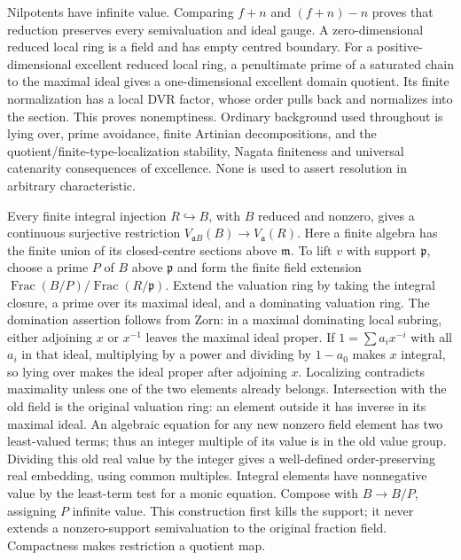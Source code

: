 \documentclass[11pt]{article}
\begin{document}
Nilpotents have infinite value. Comparing \(f+n\) and \((f+n)-n\) proves that reduction preserves every semivaluation and ideal gauge. A zero-dimensional reduced local ring is a field and has empty centred boundary. For a positive-dimensional excellent reduced local ring, a penultimate prime of a saturated chain to the maximal ideal gives a one-dimensional excellent domain quotient. Its finite normalization has a local DVR factor, whose order pulls back and normalizes into the section. This proves nonemptiness. Ordinary background used throughout is lying over, prime avoidance, finite Artinian decompositions, and the quotient/finite-type-localization stability, Nagata finiteness and universal catenarity consequences of excellence. None is used to assert resolution in arbitrary characteristic.

Every finite integral injection \(R\hookrightarrow B\), with \(B\) reduced and nonzero, gives a continuous surjective restriction \(V_{\mathfrak aB}(B)\to V_{\mathfrak a}(R)\). Here a finite algebra has the finite union of its closed-centre sections above \(\mathfrak m\). To lift \(v\) with support \(\mathfrak p\), choose a prime \(P\) of \(B\) above \(\mathfrak p\) and form the finite field extension \(\operatorname{Frac}(B/P)/\operatorname{Frac}(R/\mathfrak p)\). Extend the valuation ring by taking the integral closure, a prime over its maximal ideal, and a dominating valuation ring. The domination assertion follows from Zorn: in a maximal dominating local subring, either adjoining \(x\) or \(x^{-1}\) leaves the maximal ideal proper. If \(1=\sum a_i x^{-i}\) with all \(a_i\) in that ideal, multiplying by a power and dividing by \(1-a_0\) makes \(x\) integral, so lying over makes the ideal proper after adjoining \(x\). Localizing contradicts maximality unless one of the two elements already belongs. Intersection with the old field is the original valuation ring: an element outside it has inverse in its maximal ideal. An algebraic equation for any new nonzero field element has two least-valued terms; thus an integer multiple of its value is in the old value group. Dividing this old real value by the integer gives a well-defined order-preserving real embedding, using common multiples. Integral elements have nonnegative value by the least-term test for a monic equation. Compose with \(B\to B/P\), assigning \(P\) infinite value. This construction first kills the support; it never extends a nonzero-support semivaluation to the original fraction field. Compactness makes restriction a quotient map.
\end{document}
